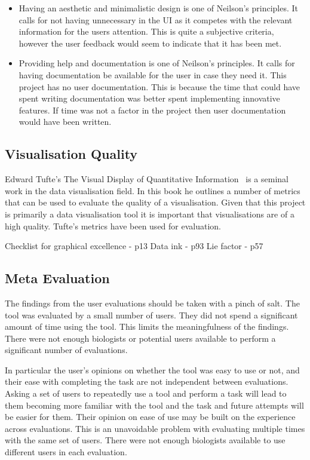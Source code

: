 \begin{itemize}
\item Having an aesthetic and minimalistic design is one of Neilson's principles.  It calls for not having unnecessary in the \ac{UI} as it competes with the relevant information for the users attention.  This is quite a subjective criteria, however the user feedback would seem to indicate that it has been met.
\item Providing help and documentation is one of Neilson's principles.  It calls for having documentation be available for the user in case they need it.  This project has no user documentation.  This is because the time that could have spent writing documentation was better spent implementing innovative features.  If time was not a factor in the project then user documentation would have been written.
\end{itemize}

\subsection{Visualisation Quality}

Edward Tufte's The Visual Display of Quantitative Information~\cite{tufte} is a seminal work in the data visualisation field.  In this book he outlines a number of metrics that can be used to evaluate the quality of a visualisation.  Given that this project is primarily a data visualisation tool it is important that visualisations are of a high quality.  Tufte's metrics have been used for evaluation.

Checklist for graphical excellence - p13
Data ink - p93
Lie factor - p57

\subsection{Meta Evaluation}
The findings from the user evaluations should be taken with a pinch of salt.  The tool was evaluated by a small number of users.  They did not spend a significant amount of time using the tool.  This limits the meaningfulness of the findings.  There were not enough biologists or potential users available to perform a significant number of evaluations.

In particular the user's opinions on whether the tool was easy to use or not, and their ease with completing the task are not independent between evaluations.  Asking a set of users to repeatedly use a tool and perform a task will lead to them becoming more familiar with the tool and the task and future attempts will be easier for them.  Their opinion on ease of use may be built on the experience across evaluations.  This is an unavoidable problem with evaluating multiple times with the same set of users.  There were not enough biologists available to use different users in each evaluation.

